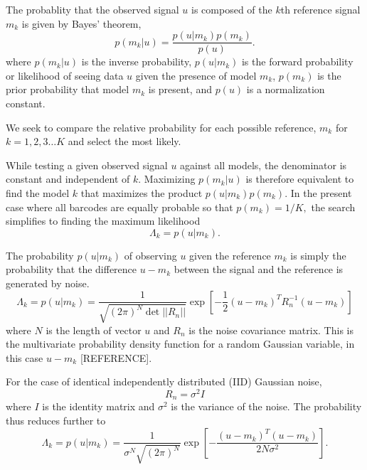 The probablity that the observed signal $u$ is composed of the $k$th reference signal $m_k$ is given by Bayes' theorem,
\begin{equation}\label{eq:Bayes}
p(m_k|u) = \frac{p(u|m_k)p(m_k)} {p(u)}.
\end{equation}
where $p(m_k|u)$ is the inverse probability, $p(u|m_k)$ is the forward probability or likelihood of seeing data $u$ given the presence of model $m_k$, $p(m_k)$ is the prior probability that model $m_k$ is present, and $p(u)$ is a normalization constant.

We seek to compare the relative  probability for each possible reference, $m_k$ for $k=1,2,3 \ldots K$ and select the most likely.  

While testing a given observed signal $u$ against all models, the denominator is constant and independent of $k$. Maximizing $p(m_k|u)$ is therefore equivalent to find the model $k$ that maximizes the product  $p(u|m_k)p(m_k)$.
In the present case where all barcodes are equally probable so that
$p(m_k)=1/K,$ 
the search simplifies to finding the maximum likelihood 
\begin{equation}
\Lambda_k = p(u|m_k).
\end{equation}



The probability $p(u|m_k)$ of observing $u$ given the reference $m_k$  is simply the probability that the difference $u-m_k$ between the signal and the reference is generated by noise.
\begin{equation}\label{eq:Main}
\Lambda_k = p(u|m_k) = \frac{1}{  \sqrt{ (2\pi)^N \det || R_n||} } \exp\left[ -\frac{1}{2}  (u-m_k)^T R_n^{-1} (u-m_k) \right]
\end{equation}
where $N$ is the length of vector $u$ and $R_n$ is the noise covariance matrix. This is the multivariate probability density function for a random Gaussian variable, in this case $u-m_k$ [REFERENCE].

For the case of identical independently distributed (IID) Gaussian noise, 
\begin{equation}
R_n=\sigma^2 I
\end{equation}
where $I$ is the identity matrix and $\sigma^2$ is the variance of the noise. The probability thus reduces further to
\begin{equation}\label{eq:iidEnergy}
\Lambda_k = p(u|m_k) = \frac{1}{  \sigma^N \sqrt{ (2\pi)^N}   } \exp\left[ -\frac{(u-m_k)^T(u-m_k)} {2 N \sigma^2 } \right].
\end{equation}


